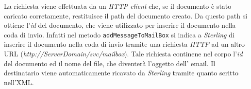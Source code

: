 La richiesta viene effettuata da un \textit{HTTP client} che, se il documento è stato caricato corretamente, restituisce il path del documento creato.
Da questo path si ottiene l'\textit{id} del documento, che viene utilizzato per inserire il documento nella coda di invio.
Infatti nel metodo \texttt{addMessageToMailBox} si indica a \textit{Sterling} di inserire il documento nella coda di invio tramite una richiesta \textit{HTTP}
ad un altro URL (\textit{http://ServerDomain/svc/mailbox}).
Tale richiesta continene nel corpo l'\textit{id} del documento ed il nome del file, che diventerà l'oggetto dell' email.
Il destinatario viene automaticamente ricavato da \textit{Sterling} tramite quanto scritto nell'XML.

